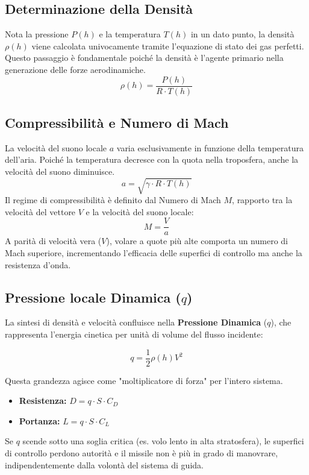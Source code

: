 \documentclass[12pt,a4paper]{article}
\begin{document}
\subsection{Determinazione della Densità}
Nota la pressione $P(h)$ e la temperatura $T(h)$ in un dato punto, la densità $\rho(h)$ viene calcolata univocamente tramite l'equazione di stato dei gas perfetti. Questo passaggio è fondamentale poiché la densità è l'agente primario nella generazione delle forze aerodinamiche.
\begin{equation}
    \rho(h) = \frac{P(h)}{R \cdot T(h)}
\end{equation}

\subsection{Compressibilità e Numero di Mach}
La velocità del suono locale $a$ varia esclusivamente in funzione della temperatura dell'aria. Poiché la temperatura decresce con la quota nella troposfera, anche la velocità del suono diminuisce.
\begin{equation}
    a = \sqrt{\gamma \cdot R \cdot T(h)}
\end{equation}
Il regime di compressibilità è definito dal Numero di Mach $M$, rapporto tra la velocità del vettore $V$ e la velocità del suono locale:
\begin{equation}
    M = \frac{V}{a}
\end{equation}
A parità di velocità vera ($V$), volare a quote più alte comporta un numero di Mach superiore, incrementando l'efficacia delle superfici di controllo ma anche la resistenza d'onda.

\subsection{Pressione locale Dinamica ($q$)}
La sintesi di densità e velocità confluisce nella \textbf{Pressione Dinamica} ($q$), che rappresenta l'energia cinetica per unità di volume del flusso incidente:

\begin{equation}
    q = \frac{1}{2} \rho(h) V^2
\end{equation}

Questa grandezza agisce come "moltiplicatore di forza" per l'intero sistema.
\begin{itemize}
    \item \textbf{Resistenza:} $D = q \cdot S \cdot C_D$
    \item \textbf{Portanza:} $L = q \cdot S \cdot C_L$
\end{itemize}
Se $q$ scende sotto una soglia critica (es. volo lento in alta stratosfera), le superfici di controllo perdono autorità e il missile non è più in grado di manovrare, indipendentemente dalla volontà del sistema di guida.
\end{document}
